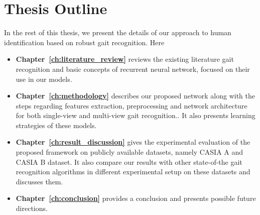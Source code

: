 \section{Thesis Outline} 
In the rest of this thesis, we present the details of our approach to human identification based on robust gait recognition. Here
\begin{itemize}
\item \textbf{Chapter~\ref{ch:literature_review}} reviews the existing literature gait recognition and basic concepts of recurrent neural network, focused on their use in our models. 

\item \textbf{Chapter~\ref{ch:methodology}} describes our proposed network along with the steps regarding features extraction, preprocessing and network architecture for both single-view and multi-view gait recognition.. It also presents learning strategies of these models. 

\item \textbf{Chapter~\ref{ch:result_discussion} }gives the experimental evaluation of the proposed framework on publicly available datasets, namely CASIA A and CASIA B dataset. It also compare our results with other state-of-the gait recognition algorithms in different experimental setup on these datasets and discusses them. 

\item \textbf{Chapter~\ref{ch:conclusion}} provides a conclusion and presents possible future directions.
\end{itemize}


